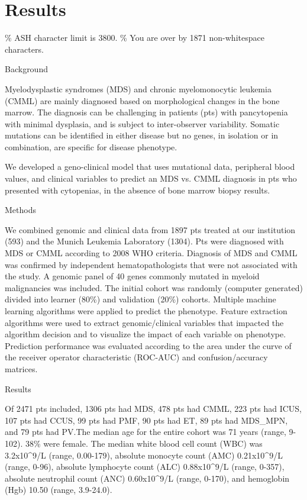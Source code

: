 \section{Results}%
\% ASH character limit is 3800. 
\% You are over by 1871 non-whitespace characters.


Background

Myelodysplastic syndromes (MDS) and chronic myelomonocytic leukemia (CMML) are mainly diagnosed based on morphological changes in the bone marrow. The diagnosis can be challenging in patients (pts) with pancytopenia with minimal dysplasia, and is subject to inter-observer variability. Somatic mutations can be identified in either disease but no genes, in isolation or in combination, are specific for disease phenotype.

We developed a geno-clinical model that uses mutational data, peripheral blood values, and clinical variables to predict an MDS vs. CMML diagnosis in pts who presented with cytopenias, in the absence of bone marrow biopsy results.


Methods

We combined genomic and clinical data from 1897 pts treated at our institution (593) and the Munich Leukemia Laboratory (1304). Pts were diagnosed with MDS or CMML according to 2008 WHO criteria. Diagnosis of MDS and CMML was confirmed by independent hematopathologists that were not associated with the study. A genomic panel of 40 genes commonly mutated in myeloid malignancies was included. The initial cohort was randomly (computer generated) divided into learner (80\%) and validation (20\%) cohorts. Multiple machine learning algorithms were applied to predict the phenotype. Feature extraction algorithms were used to extract genomic/clinical variables that impacted the algorithm decision and to visualize the impact of each variable on phenotype. Prediction performance was evaluated according to the area under the curve of the receiver operator characteristic (ROC-AUC) and confusion/accuracy matrices.


Results

Of 2471 pts included, 1306 pts had MDS, 478 pts had CMML, 223 pts had ICUS, 107 pts had CCUS, 99 pts had PMF, 90 pts had ET, 89 pts had MDS_MPN, and 79 pts had PV.The median age for the entire cohort was 71 years (range, 9-102). 38\% were female. The median white blood cell count (WBC) was 3.2x10^9/L (range, 0.00-179), absolute monocyte count (AMC) 0.21x10^9/L (range, 0-96), absolute lymphocyte count (ALC) 0.88x10^9/L (range, 0-357), absolute neutrophil count (ANC) 0.60x10^9/L (range, 0-170), and hemoglobin (Hgb)  10.50 (range, 3.9-24.0). 

